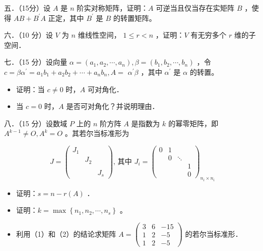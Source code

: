 \documentclass{article}
\begin{document}
五．（15分）设 \(A\) 是 \(n\) 阶实对称矩阵，证明：\(A\) 可逆当且仅当存在实矩阵 \(B\) ，使得 \(A B+B^{\prime} A\) 正定，其中 \(B^{\prime}\) 是 \(B\) 的转置矩阵。

六．（10 分）设 \(V\) 为 \(n\) 维线性空间， \(1 \leq r<n\) ，证明：\(V\) 有无穷多个 \(r\) 维的子空间．

七．（15 分）设向量 \(\alpha=\left(a_{1}, a_{2}, \cdots, a_{n}\right), \beta=\left(b_{1}, b_{2}, \cdots, b_{n}\right)\) ，令 \(c=\beta \alpha^{\prime}=a_{1} b_{1}+a_{2} b_{2}+\cdots+a_{n} b_{n}, A=\) \(\alpha^{\prime} \beta\) ，其中 \(\alpha^{\prime}\) 是 \(\alpha\) 的转置。

\begin{itemize}
  \item[（1）] 证明：当 \(c \neq 0\) 时，\(A\) 可对角化．
  \item[（2）] 当 \(c=0\) 时，\(A\) 是否可对角化？并说明理由．
\end{itemize}

八．（15 分）设数域 \(P\) 上的 \(n\) 阶方阵 \(A\) 是指数为 \(k\) 的幂零矩阵，即 \(A^{k-1} \neq O, A^{k}=O\) 。其若尔当标准形为

\[
J=\left(\begin{array}{ccc}
J_{1} & & \\
& J_{2} & \\
& & \\
& & J_{s}
\end{array}\right) \text {, 其中 } J_{i}=\left(\begin{array}{cccc}
0 & 1 & & \\
& 0 & \ddots & \\
& & & 1 \\
& & & 0
\end{array}\right)_{n_{i} \times n_{i}}
\]

\begin{itemize}
  \item[（1）] 证明：\(s=n-r(A)\) ．
  \item[（2）] 证明：\(k=\max \left\{n_{1}, n_{2}, \cdots, n_{s}\right\}\) 。
  \item[（3）] 利用（1）和（2）的结论求矩阵 \(A=\left(\begin{array}{ccc}3 & 6 & -15 \\ 1 & 2 & -5 \\ 1 & 2 & -5\end{array}\right)\) 的若尔当标准形．
\end{itemize}
\end{document}
